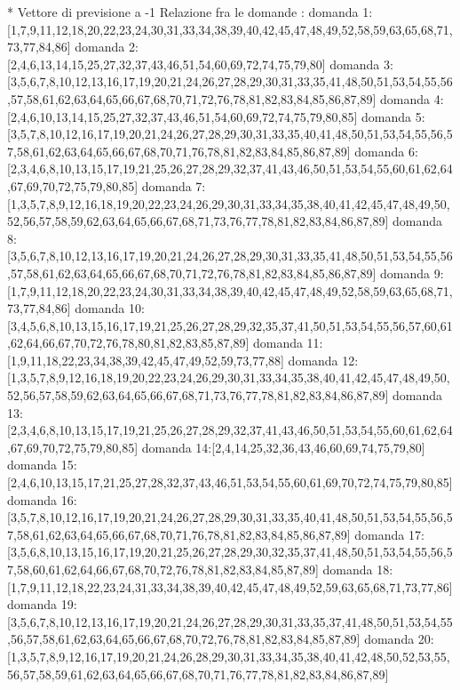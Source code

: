 * Vettore di previsione a -1
Relazione fra le domande :
domanda 1:[1,7,9,11,12,18,20,22,23,24,30,31,33,34,38,39,40,42,45,47,48,49,52,58,59,63,65,68,71,73,77,84,86]
domanda 2:[2,4,6,13,14,15,25,27,32,37,43,46,51,54,60,69,72,74,75,79,80]
domanda 3:[3,5,6,7,8,10,12,13,16,17,19,20,21,24,26,27,28,29,30,31,33,35,41,48,50,51,53,54,55,56,57,58,61,62,63,64,65,66,67,68,70,71,72,76,78,81,82,83,84,85,86,87,89]
domanda 4:[2,4,6,10,13,14,15,25,27,32,37,43,46,51,54,60,69,72,74,75,79,80,85]
domanda 5:[3,5,7,8,10,12,16,17,19,20,21,24,26,27,28,29,30,31,33,35,40,41,48,50,51,53,54,55,56,57,58,61,62,63,64,65,66,67,68,70,71,76,78,81,82,83,84,85,86,87,89]
domanda 6:[2,3,4,6,8,10,13,15,17,19,21,25,26,27,28,29,32,37,41,43,46,50,51,53,54,55,60,61,62,64,67,69,70,72,75,79,80,85]
domanda 7:[1,3,5,7,8,9,12,16,18,19,20,22,23,24,26,29,30,31,33,34,35,38,40,41,42,45,47,48,49,50,52,56,57,58,59,62,63,64,65,66,67,68,71,73,76,77,78,81,82,83,84,86,87,89]
domanda 8:[3,5,6,7,8,10,12,13,16,17,19,20,21,24,26,27,28,29,30,31,33,35,41,48,50,51,53,54,55,56,57,58,61,62,63,64,65,66,67,68,70,71,72,76,78,81,82,83,84,85,86,87,89]
domanda 9:[1,7,9,11,12,18,20,22,23,24,30,31,33,34,38,39,40,42,45,47,48,49,52,58,59,63,65,68,71,73,77,84,86]
domanda 10:[3,4,5,6,8,10,13,15,16,17,19,21,25,26,27,28,29,32,35,37,41,50,51,53,54,55,56,57,60,61,62,64,66,67,70,72,76,78,80,81,82,83,85,87,89]
domanda 11:[1,9,11,18,22,23,34,38,39,42,45,47,49,52,59,73,77,88]
domanda 12:[1,3,5,7,8,9,12,16,18,19,20,22,23,24,26,29,30,31,33,34,35,38,40,41,42,45,47,48,49,50,52,56,57,58,59,62,63,64,65,66,67,68,71,73,76,77,78,81,82,83,84,86,87,89]
domanda 13:[2,3,4,6,8,10,13,15,17,19,21,25,26,27,28,29,32,37,41,43,46,50,51,53,54,55,60,61,62,64,67,69,70,72,75,79,80,85]
domanda 14:[2,4,14,25,32,36,43,46,60,69,74,75,79,80]
domanda 15:[2,4,6,10,13,15,17,21,25,27,28,32,37,43,46,51,53,54,55,60,61,69,70,72,74,75,79,80,85]
domanda 16:[3,5,7,8,10,12,16,17,19,20,21,24,26,27,28,29,30,31,33,35,40,41,48,50,51,53,54,55,56,57,58,61,62,63,64,65,66,67,68,70,71,76,78,81,82,83,84,85,86,87,89]
domanda 17:[3,5,6,8,10,13,15,16,17,19,20,21,25,26,27,28,29,30,32,35,37,41,48,50,51,53,54,55,56,57,58,60,61,62,64,66,67,68,70,72,76,78,81,82,83,84,85,87,89]
domanda 18:[1,7,9,11,12,18,22,23,24,31,33,34,38,39,40,42,45,47,48,49,52,59,63,65,68,71,73,77,86]
domanda 19:[3,5,6,7,8,10,12,13,16,17,19,20,21,24,26,27,28,29,30,31,33,35,37,41,48,50,51,53,54,55,56,57,58,61,62,63,64,65,66,67,68,70,72,76,78,81,82,83,84,85,87,89]
domanda 20:[1,3,5,7,8,9,12,16,17,19,20,21,24,26,28,29,30,31,33,34,35,38,40,41,42,48,50,52,53,55,56,57,58,59,61,62,63,64,65,66,67,68,70,71,76,77,78,81,82,83,84,86,87,89]
